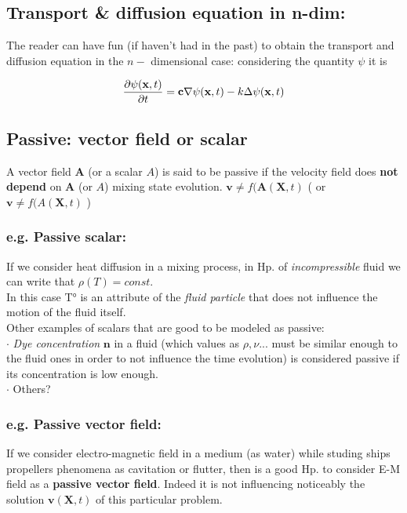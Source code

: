 \documentclass[a4paper,11pt]{article}
\begin{document}
 \subsection{Transport \& diffusion equation in n-dim:}
 The reader can have fun (if haven't had in the past) to obtain the transport and diffusion equation in the $n-$ dimensional case: considering the quantity $\psi$ it is
 
 \[  \pdv{\psi (\mathbf{x},t)}{t}= \mathbf{c} \nabla \psi (\mathbf{x},t) - k \Delta \psi (\mathbf{x},t)  \]
 
\subsection{Passive: vector field or scalar}
 A vector field $\mathbf{A}$ (or a scalar $A$) is said to be passive if the velocity field does \textbf{not depend} on $\mathbf{A}$ (or $A$) mixing state evolution.
 $ \mathbf{v} \neq f(\mathbf{A}(\mathbf{X},t) $  ( or $ \mathbf{v} \neq f(A(\mathbf{X},t) $ )
	\subsubsection{e.g. Passive scalar:}
If we consider heat diffusion in a mixing process, in Hp. of \emph{incompressible} fluid we can write that  $ \rho(T)=const. $ \\
In this case T° is an attribute of the \emph{fluid particle} that does not influence the motion of the fluid itself. \\
Other examples of scalars that are good to be modeled as passive: \\
$\cdot$ \emph{Dye concentration} $\mathbf{n}$ in a fluid (which values as $\rho , \nu ...$ must be similar enough to the fluid ones in order to not influence the time evolution) is considered passive if its concentration is low enough. \\
$\cdot$ Others? %
	\subsubsection{e.g. Passive vector field:} %
If we consider electro-magnetic field in a medium (as water) while studing ships propellers phenomena as cavitation or flutter, then is a good Hp. to consider E-M field as a \textbf{passive vector field}. 
Indeed it is not influencing noticeably the solution $\mathbf{v}(\mathbf{X},t)$ of this particular problem. 
 
\end{document}
